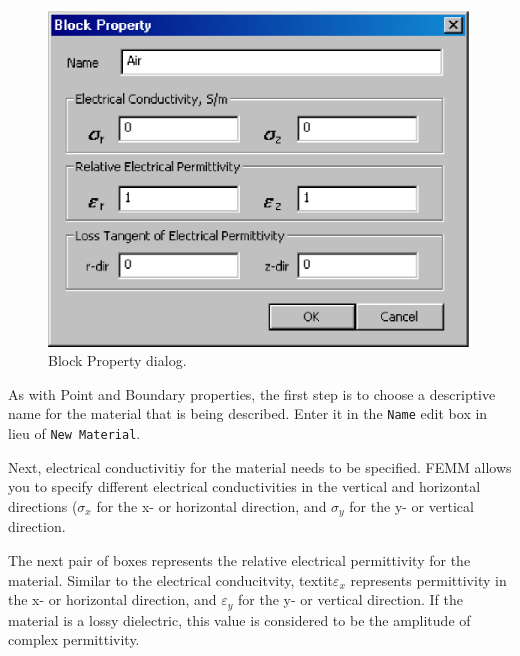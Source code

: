 \begin{figure}[htbp]
\centerline{\includegraphics{cd4.ps}}
\caption{Block Property dialog.}
\label{cfig10}
\end{figure}

As with Point and Boundary properties, the first step is to choose a
descriptive name for the material that is being described. Enter it in the
\texttt{Name} edit box in lieu of {\tt New Material}.


Next, electrical conductivitiy for the material needs to be specified. FEMM allows you
to specify different electrical conductivities in the vertical and horizontal
directions (\textit{$\sigma$}$_{x}$ for the x- or horizontal direction, and \textit{$\sigma$}$_{y}$ for the y-
or vertical direction.

The next pair of boxes represents the relative electrical permittivity for the material. Similar to the
electrical conducitvity, textit{$\varepsilon $}$_{x}$ represents permittivity in the x- or horizontal direction,
and \textit{$\varepsilon $}$_{y}$ for the y- or vertical direction.  If the material is
a lossy dielectric, this value is considered to be the amplitude of complex permittivity.

%
%

